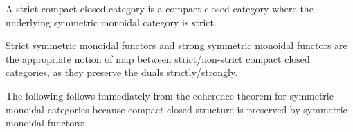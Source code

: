 \begin{definition}
\begin{description}
\hspace*{-1.1cm}



\end{description}

A strict compact closed category is a compact closed category where the underlying symmetric monoidal category is strict.

Strict symmetric monoidal functors and strong symmetric monoidal functors are the appropriate notion of map between strict/non-strict compact closed categories, as they preserve the duals strictly/strongly.
\end{definition}


The following follows immediately from the coherence theorem for symmetric monoidal categories because compact closed structure is preserved by symmetric monoidal functors:


